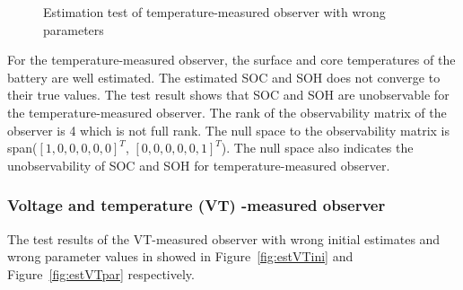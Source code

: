 \documentclass[12pt]{article}
\begin{document}
\begin{figure}[H]
\begin{subfigure}[t]{0.3\linewidth}
	\end{subfigure}	
	\caption{Estimation test of temperature-measured observer with wrong parameters }\label{fig:estTempPar}
\end{figure}
For the temperature-measured observer, the surface and core temperatures of the battery are well estimated. The estimated SOC and SOH does not converge to their true values. The test result shows that SOC and SOH are unobservable for the temperature-measured observer. The rank of the observability matrix of the observer is 4 which is not full rank. The null space to the observability matrix is span($[1,0,0,0,0,0]^T$, $[0,0,0,0,0,1]^T$). The null space also indicates the unobservability of SOC and SOH for temperature-measured observer. 
\subsubsection{Voltage and temperature (VT) -measured observer}
The test results of the VT-measured observer with wrong initial estimates and wrong parameter values in showed in Figure~\ref{fig:estVTini} and Figure~\ref{fig:estVTpar} respectively.
\end{document}
